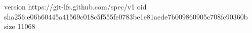 version https://git-lfs.github.com/spec/v1
oid sha256:e06b60445a41569c018c5f555fe0783be1e81aede7b009860905c708fc90360b
size 11068
